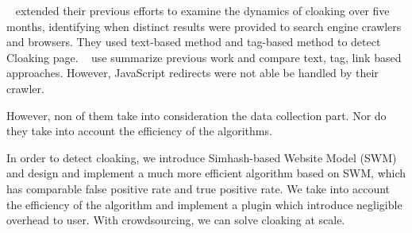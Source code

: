  ~\cite{wang2011cloak}
 extended their previous efforts to examine the dynamics of cloaking over five
 months, identifying when distinct results were provided to search engine
 crawlers and browsers.
They used text-based method and tag-based method to detect Cloaking page.
 ~\cite{deng2013uncovering} use summarize previous work and compare text, tag,
 link based approaches. However, JavaScript redirects were not able be handled by their crawler.

However, non of them take into consideration the data collection part. Nor do
they take into account the efficiency of the algorithms.

In order to detect cloaking, we introduce Simhash-based Website Model (SWM) and
design and implement a much more efficient algorithm based on SWM, which has
comparable false positive rate and true positive rate. We take into account the
efficiency of the algorithm and implement a plugin which introduce negligible
overhead to user. With crowdsourcing, we can solve cloaking at scale.



